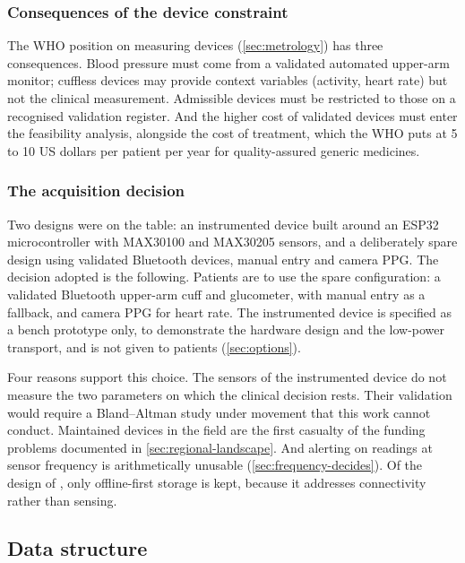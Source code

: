 \subsubsection{Consequences of the device constraint}\label{sec:metrology-consequences}

The WHO position on measuring devices (\cref{sec:metrology}) has three consequences. Blood pressure must come from a validated automated upper-arm monitor; cuffless devices may provide context variables (activity, heart rate) but not the clinical measurement. Admissible devices must be restricted to those on a recognised validation register. And the higher cost of validated devices must enter the feasibility analysis, alongside the cost of treatment, which the WHO puts at 5 to 10 US dollars per patient per year for quality-assured generic medicines.

\subsubsection{The acquisition decision}\label{sec:acq-decision}

Two designs were on the table: an instrumented device built around an ESP32 microcontroller with MAX30100 and MAX30205 sensors, and a deliberately spare design using validated Bluetooth devices, manual entry and camera PPG. The decision adopted is the following. Patients are to use the spare configuration: a validated Bluetooth upper-arm cuff and glucometer, with manual entry as a fallback, and camera PPG for heart rate. The instrumented device is specified as a bench prototype only, to demonstrate the hardware design and the low-power transport, and is not given to patients (\cref{sec:options}).

Four reasons support this choice. The sensors of the instrumented device do not measure the two parameters on which the clinical decision rests. Their validation would require a Bland--Altman study under movement that this work cannot conduct. Maintained devices in the field are the first casualty of the funding problems documented in \cref{sec:regional-landscape}. And alerting on readings at sensor frequency is arithmetically unusable (\cref{sec:frequency-decides}). Of the design of \textcite{efendi2025}, only offline-first storage is kept, because it addresses connectivity rather than sensing.

\subsection{Data structure}\label{sec:record-schema}\label{sec:adjudication}

